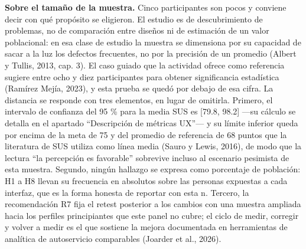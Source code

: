 \textbf{Sobre el tamaño de la muestra.} Cinco participantes son pocos y conviene decir con qué
propósito se eligieron. El estudio es de descubrimiento de problemas, no de comparación entre
diseños ni de estimación de un valor poblacional: en esa clase de estudio la muestra se dimensiona
por su capacidad de sacar a la luz los defectos frecuentes, no por la precisión de un promedio
(Albert y Tullis, 2013, cap. 3). El caso guiado que la actividad ofrece como referencia sugiere
entre ocho y diez participantes para obtener significancia estadística (Ramírez Mejía, 2023), y
esta prueba se quedó por debajo de esa cifra. La distancia se responde con tres elementos, en
lugar de omitirla. Primero, el intervalo de confianza del 95 \% para la media SUS es
[79.8, 98.2] ---su cálculo se detalla en el apartado ``Descripción de métricas UX''--- y su
límite inferior queda por encima de la meta de 75 y del promedio de referencia de 68 puntos que la
literatura de SUS utiliza como línea media (Sauro y Lewis, 2016), de modo que la lectura ``la
percepción es favorable'' sobrevive incluso al escenario pesimista de esta muestra. Segundo,
ningún hallazgo se expresa como porcentaje de población: H1 a H8 llevan su frecuencia en absolutos
sobre las personas expuestas a cada interfaz, que es la forma honesta de reportar con esta n.
Tercero, la recomendación R7 fija el retest posterior a los cambios con una muestra ampliada hacia
los perfiles principiantes que este panel no cubre; el ciclo de medir, corregir y volver a medir
es el que sostiene la mejora documentada en herramientas de analítica de autoservicio comparables
(Joarder et al., 2026).
